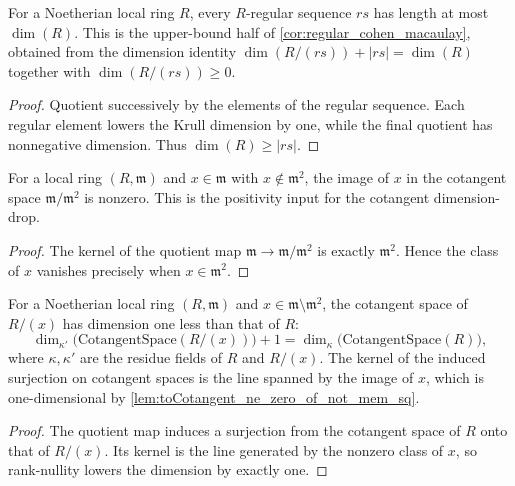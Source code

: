 \begin{lemma}\leanok
  \label{lem:length_le_ringKrullDim_of_isRegular}
  For a Noetherian local ring \(R\), every \(R\)-regular sequence \(rs\) has length at
  most \(\dim(R)\). This is the upper-bound half of \cref{cor:regular_cohen_macaulay},
  obtained from the dimension identity \(\dim(R / (rs)) + |rs| = \dim(R)\) together with
  \(\dim(R / (rs)) \geq 0\).
\end{lemma}
\begin{proof}

\leanok
  Quotient successively by the elements of the regular sequence.
  Each regular element lowers the Krull dimension by one, while the final
  quotient has nonnegative dimension. Thus
  \(\dim(R)\geq |rs|\).
\end{proof}

\begin{lemma}\leanok
  \label{lem:toCotangent_ne_zero_of_not_mem_sq}
  For a local ring \((R, \mathfrak m)\) and \(x \in \mathfrak m\) with \(x \notin \mathfrak m^2\),
  the image of \(x\) in the cotangent space \(\mathfrak m / \mathfrak m^2\) is nonzero. This is
  the positivity input for the cotangent dimension-drop.
\end{lemma}
\begin{proof}

\leanok
  The kernel of the quotient map
  \(\mathfrak m\to\mathfrak m/\mathfrak m^2\) is exactly
  \(\mathfrak m^2\). Hence the class of \(x\) vanishes precisely when
  \(x\in\mathfrak m^2\).
\end{proof}

\begin{lemma}\leanok
  \label{lem:finrank_cotangentSpace_quot_span_singleton_succ}
  For a Noetherian local ring \((R, \mathfrak m)\) and \(x \in \mathfrak m \setminus \mathfrak m^2\),
  the cotangent space of \(R / (x)\) has dimension one less than that of \(R\):
  \[
    \dim_{\kappa'}\!\bigl(\text{CotangentSpace}(R/(x))\bigr) + 1
      = \dim_{\kappa}\!\bigl(\text{CotangentSpace}(R)\bigr),
  \]
  where \(\kappa, \kappa'\) are the residue fields of \(R\) and \(R/(x)\). The kernel of
  the induced surjection on cotangent spaces is the line spanned by the image of \(x\),
  which is one-dimensional by \cref{lem:toCotangent_ne_zero_of_not_mem_sq}.
\end{lemma}
\begin{proof}

\leanok
  The quotient map induces a surjection from the cotangent space of
  \(R\) onto that of \(R/(x)\). Its kernel is the line generated by the
  nonzero class of \(x\), so rank-nullity lowers the dimension by exactly one.
\end{proof}

